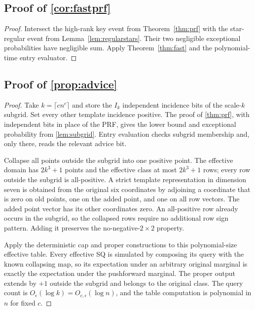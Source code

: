 \subsection[Proof of result fastprf]{Proof of \cref{cor:fastprf}}\label{proof:fastprf}
\begin{proof}
Intersect the high-rank key event from Theorem~\ref{thm:prf} with the star-regular event from Lemma~\ref{lem:regularstars}. Their two negligible exceptional probabilities have negligible sum. Apply Theorem~\ref{thm:fast} and the polynomial-time entry evaluator.
\end{proof}

\subsection[Polynomial advice]{Proof of \cref{prop:advice}}\label{proof:advice}
\begin{proof}

Take $k=\lceil cn^c\rceil$ and store the $I_k$ independent incidence bits of the scale-$k$ subgrid. Set every other template incidence positive. The proof of \cref{thm:prf}, with independent bits in place of the PRF, gives the lower bound and exceptional probability from \cref{lem:subgrid}. Entry evaluation checks subgrid membership and, only there, reads the relevant advice bit.

Collapse all points outside the subgrid into one positive point. The effective domain has $2k^3+1$ points and the effective class at most $2k^3+1$ rows; every row outside the subgrid is all-positive. A strict template representation in dimension seven is obtained from the original six coordinates by adjoining a coordinate that is zero on old points, one on the added point, and one on all row vectors. The added point vector has its other coordinates zero. An all-positive row already occurs in the subgrid, so the collapsed rows require no additional row sign pattern. Adding it preserves the no-negative-$2\times2$ property.

Apply the deterministic cap and proper constructions to this polynomial-size effective table. Every effective SQ is simulated by composing its query with the known collapsing map, so its expectation under an arbitrary original marginal is exactly the expectation under the pushforward marginal. The proper output extends by $+1$ outside the subgrid and belongs to the original class. The query count is $O_\epsilon(\log k)=O_{c,\epsilon}(\log n)$, and the table computation is polynomial in $n$ for fixed $c$.

\end{proof}
